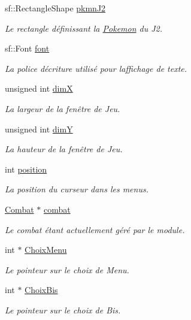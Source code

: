 \begin{DoxyCompactItemize}
sf\+::\+Rectangle\+Shape \hyperlink{class_s_f_m_l_combat_ac85b298cc8a29f2ea61b5d1e76a4f427}{pkmn\+J2}
\begin{DoxyCompactList}\small\item\em Le rectangle définissant la \hyperlink{class_pokemon}{Pokemon} du J2. \end{DoxyCompactList}\item 
sf\+::\+Font \hyperlink{class_s_f_m_l_combat_a38592e5f22439c81e07f3ffee4012a5f}{font}
\begin{DoxyCompactList}\small\item\em La police d\textquotesingle{}écriture utilisé pour l\textquotesingle{}affichage de texte. \end{DoxyCompactList}\item 
unsigned int \hyperlink{class_s_f_m_l_combat_aad9f3c91f2ec93a927d14d21d18df8bf}{dimX}
\begin{DoxyCompactList}\small\item\em La largeur de la fenêtre de Jeu. \end{DoxyCompactList}\item 
unsigned int \hyperlink{class_s_f_m_l_combat_a07171a9f601831e2ffba2cab5c072bba}{dimY}
\begin{DoxyCompactList}\small\item\em La hauteur de la fenêtre de Jeu. \end{DoxyCompactList}\item 
int \hyperlink{class_s_f_m_l_combat_a21d930da921cc2aa1cdc55b417c2fe0b}{position}
\begin{DoxyCompactList}\small\item\em La position du curseur dans les menus. \end{DoxyCompactList}\item 
\hyperlink{class_combat}{Combat} $\ast$ \hyperlink{class_s_f_m_l_combat_a3bddd4f06e74010cb91565b6b23a2f22}{combat}
\begin{DoxyCompactList}\small\item\em Le combat étant actuellement géré par le module. \end{DoxyCompactList}\item 
int $\ast$ \hyperlink{class_s_f_m_l_combat_ac89c3f6d77a8238bf105586f861f1195}{Choix\+Menu}
\begin{DoxyCompactList}\small\item\em Le pointeur sur le choix de Menu. \end{DoxyCompactList}\item 
int $\ast$ \hyperlink{class_s_f_m_l_combat_ad76ea7634796fda2075edda681735375}{Choix\+Bis}
\begin{DoxyCompactList}\small\item\em Le pointeur sur le choix de Bis. \end{DoxyCompactList}\end{DoxyCompactItemize}


